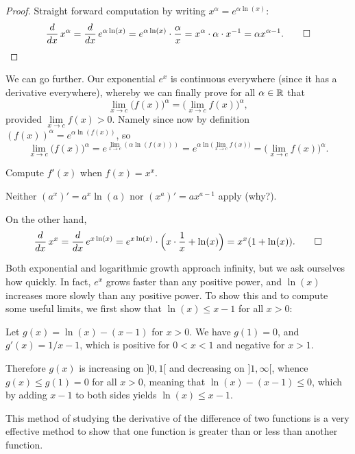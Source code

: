 \begin{proof}
	Straight forward computation by writing $x^\alpha = e^{\alpha \ln(x)}$:
	\[
		\frac{d}{d x} \, x^\alpha = \frac{d}{d x} \, e^{\alpha \ln(x)} = e^{\alpha \ln(x)} \cdot \frac{\alpha}{x} = x^\alpha \cdot \alpha \cdot x^{-1} = \alpha x^{\alpha - 1}.\qedhere
	\]
\end{proof}

\noindent
We can go further. Our exponential $e^x$ is continuous everywhere (since it has a derivative everywhere), whereby we can finally prove for all $\alpha \in \mathbb{R}$ that
\[
	\lim_{x \to c} \big ( f(x) \big )^\alpha = \Big ( \lim_{x \to c} f(x) \Big )^\alpha,
\]
provided $\lim\limits_{x \to c} f(x) > 0$. Namely since now by definition $(f(x))^\alpha = e^{\alpha \ln(f(x))}$, so
\[
	\lim_{x \to c} \big ( f(x) \big )^\alpha = e^{\lim\limits_{x \to c} (\alpha \ln(f(x)))} = e^{\alpha \ln \big ( \lim\limits_{x \to c} f(x) \big )} = \Big ( \lim_{x \to c} f(x) \Big )^\alpha.
\]

\begin{example}
	Compute $f'(x)$ when $f(x) = x^x$.

	Neither $(a^x)' = a^x \ln(a)$ nor $(x^a)' = a x^{a - 1}$ apply (why?).

	On the other hand,
	\[
		\frac{d}{d x} \, x^x = \frac{d}{d x} \, e^{x \ln(x)} = e^{x \ln(x)} \cdot \Big ( x \cdot \frac{1}{x} + \ln(x) \Big ) = x^x (1 + \ln(x)). \qedhere
	\]
\end{example}


Both exponential and logarithmic growth approach infinity, but we ask ourselves how quickly. In fact, $e^x$ grows faster than any positive power, and $\ln(x)$ increases more slowly than any positive power. To show this and to compute some useful limits, we first show that $\ln(x) \leq x - 1$ for all $x > 0$:

Let $g(x) = \ln(x) - (x - 1)$ for $x > 0$. We have $g(1) = 0$, and $g'(x) = 1/x - 1$, which is positive for $0 < x < 1$ and negative for $x > 1$.

Therefore $g(x)$ is increasing on ${]{0, 1}[}$ and decreasing on ${]{1, \infty}[}$, whence $g(x) \leq g(1) = 0$ for all $x > 0$, meaning that $\ln(x) - (x - 1) \leq 0$, which by adding $x - 1$ to both sides yields $\ln(x) \leq x - 1$.

This method of studying the derivative of the difference of two functions is a very effective method to show that one function is greater than or less than another function.

